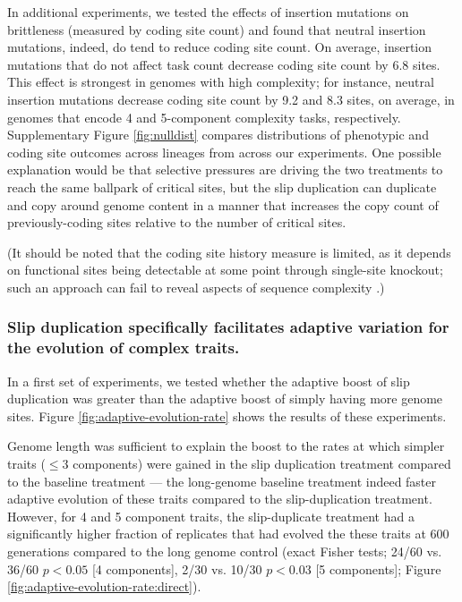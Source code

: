 In additional experiments, we tested the effects of insertion mutations on brittleness (measured by coding site count) and found that neutral insertion mutations, indeed, do tend to reduce coding site count.
On average, insertion mutations that do not affect task count decrease coding site count by 6.8 sites.
This effect is strongest in genomes with high complexity; for instance, neutral insertion mutations decrease coding site count by 9.2 and 8.3 sites, on average, in genomes that encode 4 and 5-component complexity tasks, respectively.
Supplementary Figure \ref{fig:nulldist} compares distributions of phenotypic and coding site outcomes across lineages from across our experiments.
One possible explanation would be that selective pressures are driving the two treatments to reach the same ballpark of critical sites, but the slip duplication can duplicate and copy around genome content in a manner that increases the copy count of previously-coding sites relative to the number of critical sites.

(It should be noted that the coding site history measure is limited, as it depends on functional sites being detectable at some point through single-site knockout; such an approach can fail to reveal aspects of sequence complexity \citep{moreno2024cryptic}.)

\subsubsection{Slip duplication specifically facilitates adaptive variation for the evolution of complex traits.}



In a first set of experiments, we tested whether the adaptive boost of slip duplication was greater than the adaptive boost of simply having more genome sites.
Figure \ref{fig:adaptive-evolution-rate} shows the results of these experiments.

Genome length was sufficient to explain the boost to the rates at which simpler traits ($\leq 3$ components) were gained in the slip duplication treatment compared to the baseline treatment --- the long-genome baseline treatment indeed faster adaptive evolution of these traits compared to the slip-duplication treatment.
However, for 4 and 5 component traits, the slip-duplicate treatment had a significantly higher fraction of replicates that had evolved the these traits at 600 generations compared to the long genome control (exact Fisher tests; 24/60 vs. 36/60 $p<0.05$ [4 components], 2/30 vs. 10/30 $p < 0.03$ [5 components]; Figure \ref{fig:adaptive-evolution-rate:direct}).

